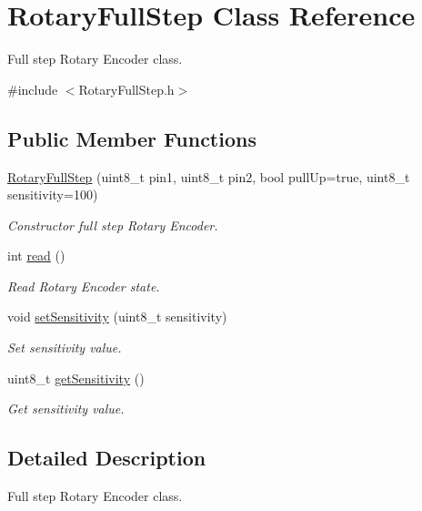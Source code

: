 \hypertarget{class_rotary_full_step}{}\section{Rotary\+Full\+Step Class Reference}
\label{class_rotary_full_step}


Full step Rotary Encoder class.  




{\ttfamily \#include $<$Rotary\+Full\+Step.\+h$>$}

\subsection*{Public Member Functions}
\begin{DoxyCompactItemize}
\item 
\hyperlink{class_rotary_full_step_aaf74de6f9ce49620a10b507e83591956}{Rotary\+Full\+Step} (uint8\+\_\+t pin1, uint8\+\_\+t pin2, bool pull\+Up=true, uint8\+\_\+t sensitivity=100)
\begin{DoxyCompactList}\small\item\em Constructor full step Rotary Encoder. \end{DoxyCompactList}\item 
int \hyperlink{class_rotary_full_step_a8abd339f6bba83afde753e450f1ba6c7}{read} ()
\begin{DoxyCompactList}\small\item\em Read Rotary Encoder state. \end{DoxyCompactList}\item 
void \hyperlink{class_rotary_full_step_a413a674f1244573ad90befc73fd6e1d4}{set\+Sensitivity} (uint8\+\_\+t sensitivity)
\begin{DoxyCompactList}\small\item\em Set sensitivity value. \end{DoxyCompactList}\item 
uint8\+\_\+t \hyperlink{class_rotary_full_step_a55a1fce8a0b6436767f204ce16bc86fd}{get\+Sensitivity} ()
\begin{DoxyCompactList}\small\item\em Get sensitivity value. \end{DoxyCompactList}\end{DoxyCompactItemize}


\subsection{Detailed Description}
Full step Rotary Encoder class. 

